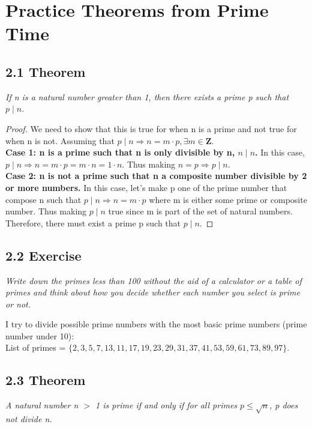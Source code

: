 \documentclass{article}
\begin{document}
\section*{Practice Theorems from Prime Time}

\subsection*{2.1 Theorem} 
\quad \textit{If n is a natural number greater than 1, then there exists a prime p such that $p \mid n$.}

\begin{proof}
We need to show that this is true for when n is a prime and not true for when n is not. Assuming that $p \mid n \Longrightarrow  n = m \cdot p, \exists m \in \mathbf{Z}$.\\
\textbf{Case 1: n is a prime such that n is only divisible by n, $n \mid n$.} In this case, $p \mid n \Longrightarrow n = m \cdot p = m \cdot n = 1 \cdot n$. Thus making $n = p \Longrightarrow p \mid n$.\\
\textbf{Case 2: n is not a prime such that n a composite number divisible by 2 or more numbers.} In this case, let's make p one of the prime number that compose n such that $p \mid n \Longrightarrow n = m \cdot p$ where m is either some prime or composite number. Thus making  $p \mid n$ true since m is part of the set of natural numbers.\\
Therefore, there must exist a prime p such that $p \mid n$.
\end{proof}

\subsection*{2.2 Exercise} 
\quad \textit{Write down the primes less than 100 without the aid of a calculator or a table of primes and think about how you decide whether each number you select is prime or not.}

I try to divide possible prime numbers with the most basic prime numbers (prime number under 10):\\
List of primes = $\{2,3,5,7,13,11,17,19,23,29,31,37,41,53,59,61,73,89,97\}$.

\subsection*{2.3 Theorem} 
\quad \textit{A natural number n $>$ 1 is prime if and only if for all primes $p \leq \sqrt{n}$, p does not divide n.}
\end{document}
